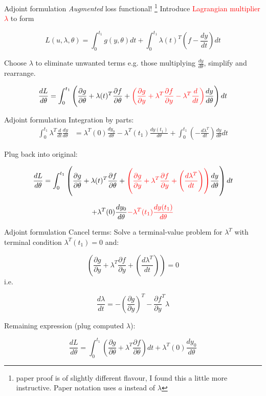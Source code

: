 \documentclass[usenames,dvipsnames]{beamer}
\theoremstyle{definition}
\begin{document}
\begin{frame}{Adjoint formulation}
    \emph{Augmented} loss functional! \footnote{paper proof is of slightly different flavour, I found this a little more instructive. Paper notation uses $a$ instead of $\lambda$} Introduce \textcolor{red}{Lagrangian multiplier $\lambda$} to form
    
    $$L(u, \lambda, \theta) = \int_{0}^{t_1} g(y, \theta) dt + \int_{0}^{t_1}\lambda(t)^T \left( f - \frac{dy}{dt}\right) dt$$
    
    Choose $\lambda$ to eliminate unwanted terms e.g. those multiplying $\frac{dy}{d\theta}$, simplify and rearrange.

    $$\frac{dL}{d\theta} = \int_{0}^{t_1} \left(\frac{\partial g}{\partial \theta} + \lambda(t)^T \frac{\partial f}{\partial \theta} +   \textcolor{red}{\left( \frac{\partial g}{\partial y} + \lambda^T \frac{\partial f}{\partial y} - \lambda^T \frac{d}{dt}\right)} \frac{dy}{d\theta}\right)dt$$
\end{frame}

\begin{frame}{Adjoint formulation}
    Integration by parts:
    $$\begin{aligned}\int_{0}^{t_1} \lambda^T \frac{d}{dt}\frac{dy}{d\theta} &= \lambda^T(0) \frac{dy_0}{d\theta} - \lambda^T (t_1)\frac{dy(t_1)}{d\theta} + \int_{0}^{t_1}\left( -\frac{d\lambda^T}{dt}\right)\frac{dy}{d\theta}dt\end{aligned}$$

    Plug back into original:

    $$\frac{dL}{d\theta} = \int_{0}^{t_1} \left(\frac{\partial g}{\partial \theta} + \lambda(t)^T \frac{\partial f}{\partial \theta} + \textcolor{red}{\left( \frac{\partial g}{\partial y} + \lambda^T \frac{\partial f}{\partial y} + \left(\frac{d\lambda^T}{dt}\right)\right)} \frac{dy}{d\theta}\right)dt$$
    
    $$+ \lambda^T(0) \frac{dy_0}{d\theta} \textcolor{red}{- \lambda^T (t_1)\frac{dy(t_1)}{d\theta}}$$
\end{frame}

\begin{frame}{Adjoint formulation}
Cancel terms: Solve a terminal-value problem for $\lambda^T$ with terminal condition $\lambda^T(t_1)=0$ and:

$$\left( \frac{\partial g}{\partial y} + \lambda^T \frac{\partial f}{\partial y} + \left(\frac{d\lambda^T}{dt}\right)\right) = 0$$ i.e.

$$\frac{d\lambda}{dt} = -\left(\frac{\partial g}{\partial y}\right)^T - \frac{\partial f}{\partial y}^T \lambda$$

Remaining expression (plug computed $\lambda$):

$$\frac{dL}{d\theta} = \int_{0}^{t_1} \left(\frac{\partial g}{\partial \theta} + \lambda^T \frac{\partial f}{\partial \theta}\right)dt + \lambda^T(0) \frac{dy_0}{d\theta}$$ 
\end{frame}
\end{document}

